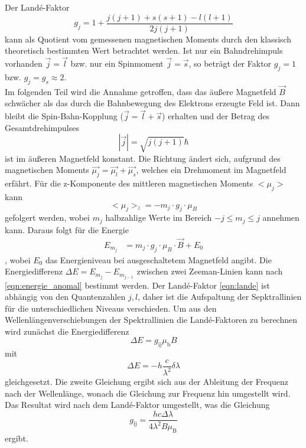 Der Landé-Faktor
\begin{equation}
    g_j = 1 + \frac{j(j+1) + s(s+1) - l(l+1)}{2j(j+1)}
    \label{eqn:lande}
\end{equation}
kann als Quotient vom gemessenen magnetischen Moments durch den klassisch theoretisch bestimmten Wert betrachtet werden.
Ist nur ein Bahndrehimpuls vorhanden $\vec{j}=\vec{l}$ bzw. nur ein Spinmoment $\vec{j}=\vec{s}$, so beträgt der Faktor $g_j=1$ bzw. $g_j = g_s \approx 2$.
\\
Im folgenden Teil wird die Annahme getroffen, dass das äußere Magnetfeld $\vec{B}$ schwächer als das durch die Bahnbewegung des Elektrons erzeugte Feld ist.
Dann bleibt die Spin-Bahn-Kopplung ($\vec{j}=\vec{l}+\vec{s}$) erhalten und der Betrag des Gesamtdrehimpulses
\begin{equation*}
    |\vec{j}| = \sqrt{j(j+1)} \hbar
\end{equation*}
ist im äußeren Magnetfeld konstant.
Die Richtung ändert sich, aufgrund des magnetischen Moments $\vec{\mu_j} = \vec{\mu_l} + \vec{\mu_s}$, welches ein Drehmoment im Magnetfeld erfährt.
Für die z-Komponente des mittleren magnetischen Moments $<\mu_j>$ kann
\begin{equation*}
    <\mu_j>_z = - m_j \cdot g_j \cdot \mu_B
\end{equation*}
gefolgert werden, wobei $m_j$ halbzahlige Werte im Bereich $-j \leq m_j \leq j$ annehmen kann.
Daraus folgt für die Energie
\begin{align}
    E_{m_j} &= m_j \cdot g_j \cdot \mu_B \cdot \vec{B} + E_0
    \label{eqn:energie_anomal}
\end{align}
, wobei $E_0$ das Energieniveau bei ausgeschaltetem Magnetfeld angibt.
Die Energiedifferenz $\Delta E = E_{m_j} - E_{m_{j-1}}$ zwischen zwei Zeeman-Linien kann nach \autoref{eqn:energie_anomal} bestimmt werden.
Der Landé-Faktor \eqref{eqn:lande} ist abhängig von den Quantenzahlen $j,l$, daher ist die Aufspaltung der Sepktrallinien für die unterschiedlichen Niveaus verschieden.
Um aus den Wellenlängenverschiebungen der Spektrallinien die Landé-Faktoren zu berechnen wird zunächst die Energiedifferenz
\begin{equation*}
    \Delta E = g _\text{ij} \mu _\text{b} B
\end{equation*}
mit
\begin{equation*}
    \Delta E = -h \frac{c}{\lambda^2} \delta \lambda
\end{equation*}
gleichgesetzt.
Die zweite Gleichung ergibt sich aus der Ableitung der Frequenz nach der Wellenlänge, wonach die Gleichung zur Frequenz hin umgestellt wird.
Das Resultat wird nach dem Landé-Faktor umgestellt, was die Gleichung 
\begin{equation}
    g_\text{ij} = \frac{hc \Delta \lambda}{4 \lambda^2 B \mu_\text{B}}
    \label{eq:Lande_Faktor}
\end{equation}
ergibt.
\FloatBarrier

